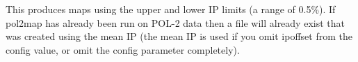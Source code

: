 \begin{terminalv}
\end{terminalv}

This produces maps using the upper and lower IP limits (a range of
0.5\%). If pol2map has already been run on POL-2 data then a file 
will already exist that was created using the 
mean IP (the mean IP is used if you omit ipoffset from the config
value, or omit the  config parameter completely). 




